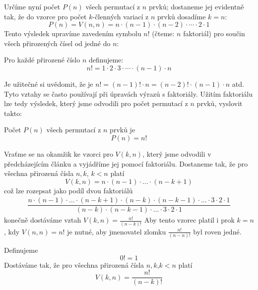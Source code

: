         Určíme nyní počet \(P(n)\) všech permutací z \(n\) prvků; dostaneme jej evidentně tak, že do
        vzorce pro počet \(k\)-členných variací z \(n\) prvků dosadíme \(k = n\):
        \begin{equation*}
          P(n) = V(n,n) = n\cdot (n-1)\cdot(n-2)\cdot\cdots\cdot2\cdot1
        \end{equation*}
        Tento výsledek upravíme zavedením symbolu \(n!\) (čteme: \(n\) faktoriál) pro součin všech
        přirozených čísel od jedné do \(n\):
        \begin{mdframed}[style=highlight]
          Pro každé přirozené číslo \(n\) definujeme:
          \begin{equation*}
            n! = 1\cdot2\cdot3\cdot\cdots\cdot(n-1)\cdot n
          \end{equation*}
        \end{mdframed}

        Je užitečné si uvědomit, že je \(n! = (n-1)!\cdot n = (n-2)!\cdot(n-1)\cdot n\) atd. Tyto
        vztahy se často používají při úpravách výrazů s faktoriály. Užitím faktoriálu lze tedy
        výsledek, který jsme odvodili pro počet permutací z \(n\) prvků, vyslovit takto:
        \begin{mdframed}[style=highlight]
          Počet \(P(n)\) všech permutací z \(n\) prvků je
          \begin{equation*}
            P(n) = n!
          \end{equation*}
        \end{mdframed}

        Vraťme se na okamžik ke vzorci pro \(V(k,n)\), který jsme odvodili v předcházejícím článku a
        vyjádříme jej pomocí faktoriálu. Dostaneme tak, že pro všechna přirozená čísla \(n, k\),
        \(k<n\) platí
        \begin{equation*}
          V(k, n) = n\cdot(n-1)\cdot\ldots\cdot(n-k+1) 
        \end{equation*}
        což lze rozepsat jako podíl dvou faktoriálů
        \begin{gather*}
          \dfrac{n\cdot(n-1)\cdot\ldots\cdot(n-k+1)
                  \cdot(n-k)\cdot(n-k-1)\cdot\ldots\cdot3\cdot2\cdot1}
                      {(n-k)\cdot(n-k-1)\cdot\ldots\cdot3\cdot2\cdot1}  
        \end{gather*}                    
        konečně dostáváme vztah \(V(k, n) = \frac{n!}{(n-k)!}\)
        \vspace{2em}
        Aby tento vzorec platil i prok \(k=n\), kdy \(V(n,n) = n!\) je nutné, aby jmenovatel zlomku
        \(\frac{n!}{(n-n)!}\) byl roven jedné.
        \begin{mdframed}[style=highlight]
          Definujeme
          \begin{equation*}
            0! = 1
          \end{equation*}
          Dostáváme tak, že pro všechna přirozená čísla \(n, k\),\(k<n\) platí
          \begin{equation*}
            V(k,n) = \dfrac{n!}{(n-k)!}
          \end{equation*}
        \end{mdframed}
        
